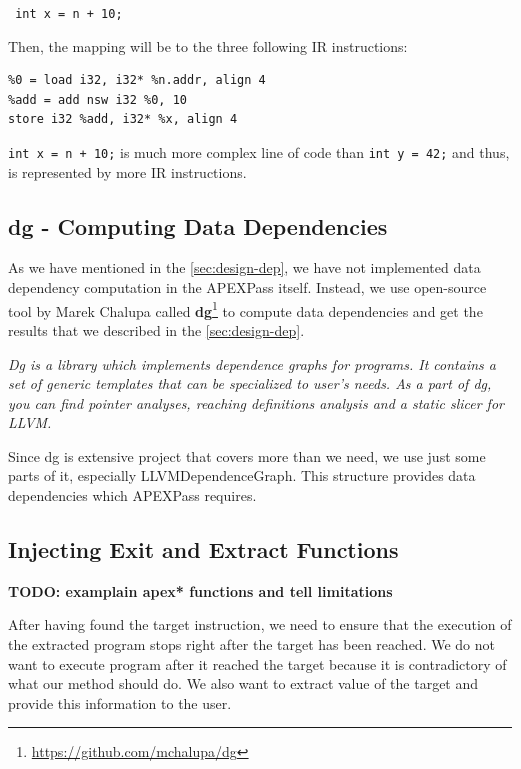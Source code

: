 \documentclass[12pt, twoside]{fithesis2}
\renewcommand{\_}{\leavevmode \kern0.07em\vbox{\hrule width0.4em}}
\begin{document}
\texttt{
int x = n + 10;
}

Then, the mapping will be to the three following IR instructions:

\begin{verbatim}
%0 = load i32, i32* %n.addr, align 4
%add = add nsw i32 %0, 10
store i32 %add, i32* %x, align 4
\end{verbatim}

\texttt{int x = n + 10;} is much more complex line of code than
\texttt{int y = 42;} and thus, is represented by more IR instructions.


\subsection{dg - Computing Data Dependencies}

As we have mentioned in the \autoref{sec:design-dep}, we have not implemented
data dependency computation in the APEXPass itself.
Instead, we use open-source tool by Marek Chalupa called \textbf{dg}\footnote{
\url{https://github.com/mchalupa/dg}
}
to compute data dependencies and get the results that we described in the
\autoref{sec:design-dep}.

\emph{Dg is a library which implements dependence graphs for programs. It
contains a set of generic templates that can be specialized to user's needs.
As a part of dg, you can find pointer analyses, reaching definitions analysis
and a static slicer for LLVM.}\cite{dg-github}

Since dg is extensive project that covers more than we need, we use just
some parts of it, especially LLVMDependenceGraph. This structure provides
data dependencies which APEXPass requires.

\subsection{Injecting Exit and Extract Functions}
\label{sub:impl_inject}

\textbf{TODO: examplain apex* functions and tell limitations}

After having found the target instruction, we need to ensure that the execution
of the extracted program stops right after the target has been reached.
We do not want to execute program after it reached the target because it is
contradictory of what our method should do.
We also want to extract value of the target and provide this information to the
user.
\end{document}
